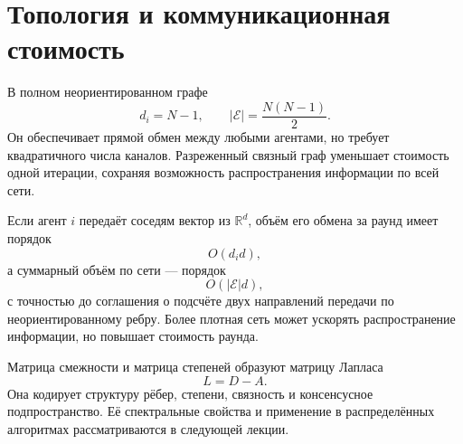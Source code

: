 \section{Топология и коммуникационная стоимость}

В полном неориентированном графе
\[
    d_i=N-1,
    \qquad
    |\mathcal E|=\frac{N(N-1)}2.
\]
Он обеспечивает прямой обмен между любыми агентами, но требует
квадратичного числа каналов. Разреженный связный граф уменьшает
стоимость одной итерации, сохраняя возможность распространения
информации по всей сети.

Если агент \(i\) передаёт соседям вектор из \(\mathbb R^d\), объём
его обмена за раунд имеет порядок
\[
    O(d_i d),
\]
а суммарный объём по сети --- порядок
\[
    O(|\mathcal E|d),
\]
с точностью до соглашения о подсчёте двух направлений передачи по
неориентированному ребру. Более плотная сеть может ускорять
распространение информации, но повышает стоимость раунда.

Матрица смежности и матрица степеней образуют матрицу Лапласа
\[
    L=D-A.
\]
Она кодирует структуру рёбер, степени, связность и консенсусное
подпространство. Её спектральные свойства и применение в
распределённых алгоритмах рассматриваются в следующей лекции.
